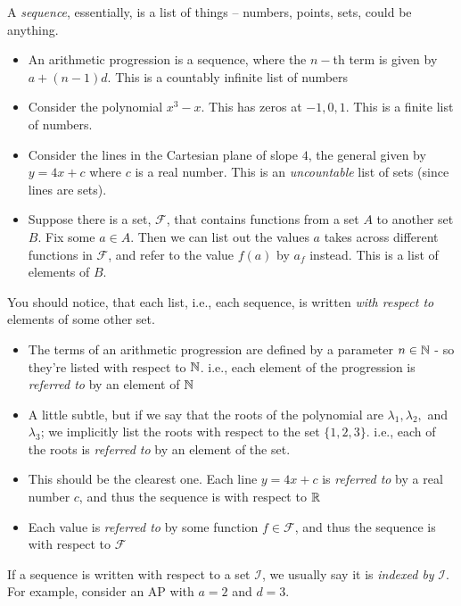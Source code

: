 

A \emph{sequence}, essentially, is a list of things -- numbers, points, sets, could be anything.

\begin{itemize}
	\item An arithmetic progression is a sequence, where the $n-$th term is given by $a + (n - 1)d$. This is a countably infinite list of numbers
	\item Consider the polynomial $x^3 - x$. This has zeros at $-1, 0, 1$. This is a finite list of numbers.
	\item Consider the lines in the Cartesian plane of slope $4$, the general given by $y = 4x + c$ where $c$ is a real number. This is an \emph{uncountable} list of sets (since lines are sets).
	\item Suppose there is a set, $\mathcal F$, that contains functions from a set $A$ to another set $B$. Fix some $a \in A$. Then we can list out the values $a$ takes across different functions in $\mathcal F$, and refer to the value $f(a)$ by $a_f$ instead. This is a list of elements of $B$.
\end{itemize}

You should notice, that each list, i.e., each sequence, is written \emph{with respect to} elements of some other set.

\begin{itemize}
	\item The terms of an arithmetic progression are defined by a parameter $n \in \mathbb{N}$ - so they're listed with respect to $\mathbb{N}$. i.e., each element of the progression is \emph{referred to} by an element of $\mathbb{N}$
	\item A little subtle, but if we say that the roots of the polynomial are $\lambda_1, \lambda_2,$ and $\lambda_3$; we implicitly list the roots with respect to the set $\{1, 2, 3\}$. i.e., each of the roots is \emph{referred to} by an element of the set.
	\item This should be the clearest one. Each line $y = 4x + c$ is \emph{referred to} by a real number $c$, and thus the sequence is with respect to $\mathbb{R}$
	\item Each value is \emph{referred to} by some function $f \in \mathcal F$, and thus the sequence is with respect to $\mathcal F$
\end{itemize}

If a sequence is written with respect to a set $\mathcal I$, we usually say it is \emph{indexed by} $\mathcal I$. For example, consider an AP with $a = 2$ and $d = 3$.


